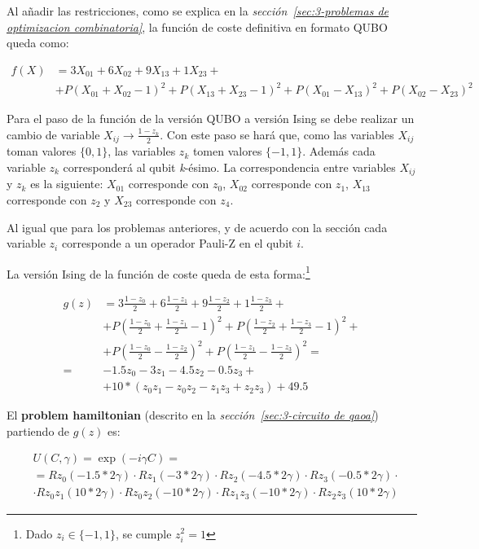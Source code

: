 Al añadir las restricciones, como se explica en la \textit{sección~\ref{sec:3-problemas de optimizacion combinatoria}}, la función de coste definitiva en formato QUBO queda como:

\begin{align*}
  f(X) &= 3X_{01} + 6X_{02} + 9X_{13} + 1X_{23} + \\
       &+ P{(X_{01} + X_{02} - 1)}^2 + P{(X_{13} + X_{23} - 1)}^2 + P{(X_{01} - X_{13})}^2 + P{(X_{02} - X_{23})}^2
\end{align*}

Para el paso de la función de la versión QUBO a versión Ising se debe realizar un cambio de variable $X_{ij} \rightarrow \frac{1 - z_k}{2}$. Con este paso se hará que, como las variables $X_{ij}$ toman valores $\{0, 1\}$, las variables $z_k$ tomen valores $\{-1, 1\}$. Además cada variable $z_k$ corresponderá al qubit \textit{k}-ésimo. La correspondencia entre variables $X_{ij}$ y $z_k$ es la siguiente:
$X_{01}$ corresponde con $z_0$,
$X_{02}$ corresponde con $z_1$,
$X_{13}$ corresponde con $z_2$ y
$X_{23}$ corresponde con $z_4$.

Al igual que para los problemas anteriores, y de acuerdo con la sección  %
cada variable $z_i$ corresponde a un operador Pauli-Z en el qubit $i$.

La versión Ising de la función de coste queda de esta forma:\footnote{Dado $z_i \in \{-1, 1\}$, se cumple $z_i^2 = 1$}

\begin{align*}
  g(z) &= 3\frac{1 - z_0}{2} + 6\frac{1 - z_1}{2} + 9\frac{1 - z_2}{2} + 1\frac{1 - z_3}{2} + \\
       &+ P{(\frac{1 - z_0}{2} + \frac{1 - z_1}{2} - 1)}^2 + P{(\frac{1 - z_2}{2} + \frac{1 - z_3}{2} - 1)}^2 + \\
       &+ P{(\frac{1 - z_0}{2} - \frac{1 - z_2}{2})}^2 + P{(\frac{1 - z_1}{2} - \frac{1 - z_3}{2})}^2 = \\
  = &  -1.5z_0 - 3z_1 - 4.5z_2 - 0.5z_3 + \\
       &+ 10*(z_0z_1 - z_0z_2 - z_1z_3 + z_2z_3) + 49.5
\end{align*}

El \textbf{problem hamiltonian} (descrito en la \textit{sección~\ref{sec:3-circuito de qaoa}}) partiendo de $g(z)$ es:

\begin{align*}
  &U(C, \gamma) = \exp(-i \gamma C) = \\
  &= Rz_0(-1.5 * 2\gamma) \cdot Rz_1(-3 * 2\gamma) \cdot Rz_2(-4.5 * 2\gamma) \cdot Rz_3(-0.5 * 2\gamma) \cdot \\
  &\cdot Rz_0z_1(10 * 2\gamma) \cdot Rz_0z_2(-10 * 2\gamma) \cdot Rz_1z_3(-10 * 2\gamma) \cdot Rz_2z_3(10 * 2\gamma)
\end{align*}

